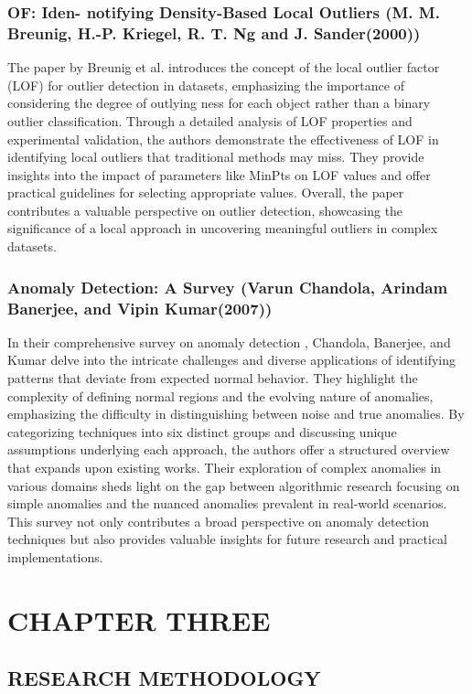 \documentclass[12pt]{report}
\begin{document}
\subsubsection{OF: Iden-
notifying Density-Based Local Outliers (M. M. Breunig, H.-P. Kriegel, R. T. Ng and J. Sander(2000))}
The paper by Breunig et al\cite{paper4}. introduces the concept of the local outlier factor (LOF) for outlier detection in datasets, emphasizing the importance of considering the degree of outlying ness for each object rather than a binary outlier classification. Through a detailed analysis of LOF properties and experimental validation, the authors demonstrate the effectiveness of LOF in identifying local outliers that traditional methods may miss. They provide insights into the impact of parameters like MinPts on LOF values and offer practical guidelines for selecting appropriate values. Overall, the paper contributes a valuable perspective on outlier detection, showcasing the significance of a local approach in uncovering meaningful outliers in complex datasets.
\subsubsection{Anomaly Detection: A Survey (Varun Chandola, Arindam Banerjee, and Vipin Kumar(2007))}
In their comprehensive survey on anomaly detection \cite{paper5}, Chandola, Banerjee, and Kumar delve into the intricate challenges and diverse applications of identifying patterns that deviate from expected normal behavior. They highlight the complexity of defining normal regions and the evolving nature of anomalies, emphasizing the difficulty in distinguishing between noise and true anomalies. By categorizing techniques into six distinct groups and discussing unique assumptions underlying each approach, the authors offer a structured overview that expands upon existing works. Their exploration of complex anomalies in various domains sheds light on the gap between algorithmic research focusing on simple anomalies and the nuanced anomalies prevalent in real-world scenarios. This survey not only contributes a broad perspective on anomaly detection techniques but also provides valuable insights for future research and practical implementations.
\clearpage 
\section*{\centering CHAPTER THREE}
\subsection*{\centering RESEARCH METHODOLOGY}
\setcounter{section}{3} %
\setcounter{subsection}{-1}
\end{document}
